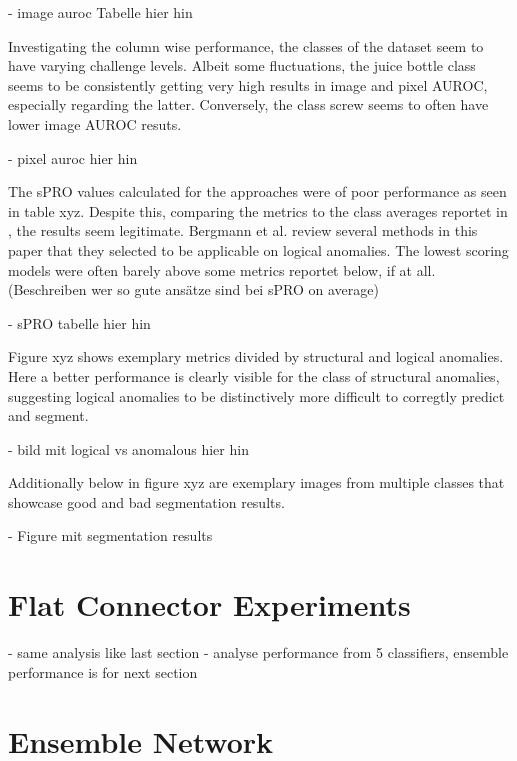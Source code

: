 - image auroc Tabelle hier hin

Investigating the column wise performance, the classes of the dataset seem to have varying challenge levels. Albeit some fluctuations, 
the juice bottle class seems to be consistently getting very high results in image and pixel AUROC, especially regarding the latter. 
Conversely, the class screw seems to often have lower image AUROC resuts.

- pixel auroc hier hin


The sPRO values calculated for the approaches were of poor performance as seen in table xyz. Despite this, comparing the metrics to the 
class averages reportet in \cite{LOCODentsAndScratchesBergmann2022}, the results seem legitimate. Bergmann et al. review several methods 
in this paper that they selected to be applicable on logical anomalies. The lowest scoring models were often barely above some metrics reportet 
below, if at all. (Beschreiben wer so gute ansätze sind bei sPRO on average)

- sPRO tabelle hier hin

Figure xyz shows exemplary metrics divided by structural and logical anomalies. Here a better performance is clearly visible for the 
class of structural anomalies, suggesting logical anomalies to be distinctively more difficult to corregtly predict and segment.

- bild mit logical vs anomalous hier hin

Additionally below in figure xyz are exemplary images from multiple classes that showcase good and bad segmentation results. 

- Figure mit segmentation results





\section{Flat Connector Experiments}
\label{sec:faltconnectorxperiments}

- same analysis like last section\newline
- analyse performance from 5 classifiers, ensemble performance is for next section


\section{Ensemble Network}
\label{sec:ensembleresults}

